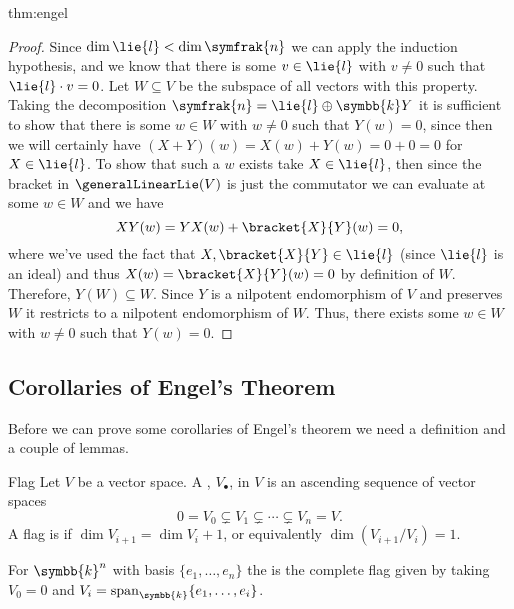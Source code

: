 \documentclass[fleqn]{NotesClass}
\renewcommand{\field}{\symbb{k}}
\DeclareMathOperator{\Span}{span}
\newcommand{\nilpotentLie}{\symfrak{n}}
\begin{document}
\begin{thm}{}{thm:engel}
\begin{proof}
            Since \(\dim \lie{l} < \dim \nilpotentLie\) we can apply the induction hypothesis, and we know that there is some \(v \in \lie{l}\) with \(v \ne 0\) such that \(\lie{l} \cdot v = 0\).
            Let \(W \subseteq V\) be the subspace of all vectors with this property.
            Taking the decomposition \(\nilpotentLie = \lie{l} \oplus \field Y\) it is sufficient to show that there is some \(w \in W\) with \(w \ne 0\) such that \(Y(w) = 0\), since then we will certainly have \((X + Y)(w) = X(w) + Y(w) = 0 + 0 = 0\) for \(X \in \lie{l}\).
            To show that such a \(w\) exists take \(X \in \lie{l}\), then since the bracket in \(\generalLinearLie(V)\) is just the commutator we can evaluate at some \(w \in W\) and we have
            \begin{equation}
                XY(w) = YX(w) + \bracket{X}{Y}(w) = 0,
            \end{equation}
            where we've used the fact that \(X, \bracket{X}{Y} \in \lie{l}\) (since \(\lie{l}\) is an ideal) and thus \(X(w) = \bracket{X}{Y}(w) = 0\) by definition of \(W\).
            Therefore, \(Y(W) \subseteq W\).
            Since \(Y\) is a nilpotent endomorphism of \(V\) and preserves \(W\) it restricts to a nilpotent endomorphism of \(W\).
            Thus, there exists some \(w \in W\) with \(w \ne 0\) such that \(Y(w) = 0\).
        \end{proof}
    \end{thm}
    
    \subsection{Corollaries of Engel's Theorem}
    Before we can prove some corollaries of Engel's theorem we need a definition and a couple of lemmas.
    
    \begin{dfn}{Flag}{}
        Let \(V\) be a vector space.
        A , \(V_{\bullet}\), in \(V\) is an ascending sequence of vector spaces
        \begin{equation}
            0 = V_0 \subsetneq V_1 \subsetneq \dotsb \subsetneq V_n = V.
        \end{equation}
        A flag is  if \(\dim V_{i+1} = \dim V_i + 1\), or equivalently \(\dim(V_{i+1}/V_i) = 1\).
        
        For \(\field^n\) with basis \(\{e_1, \dotsc, e_n\}\) the  is the complete flag given by taking \(V_0 = 0\) and \(V_i = \Span_{\field}\{e_1, \dotsc, e_i\}\).
    \end{dfn}
    
\end{document}
